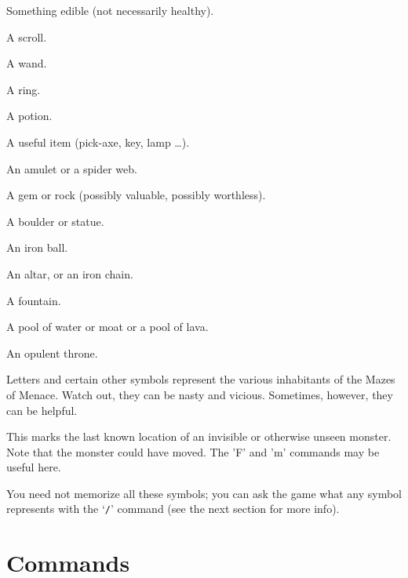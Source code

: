 \item[\tb{\%}]
Something edible (not necessarily healthy).

\item[\tb{?}]
A scroll.

\item[\tb{/}]
A wand.

\item[\tb{=}]
A ring.

\item[\tb{!}]
A potion.

\item[\tb{(}]
A useful item (pick-axe, key, lamp \ldots).

\item[\tb{"}]
An amulet or a spider web.

\item[\tb{*}]
A gem or rock (possibly valuable, possibly worthless).

\item[\tb{`}]
A boulder or statue.

\item[\tb{0}]
An iron ball.

\item[\tb{_}]
An altar, or an iron chain.

\item[\tb{\{}]
A fountain.

\item[\tb{\}}]
A pool of water or moat or a pool of lava.

\item[\tb{$\backslash$}]
An opulent throne.

\item[\tb{{\rm a}-{\rm zA}-{\rm Z} {\rm and} {\rm other} {\rm symbols}}]
Letters and certain other symbols represent the various inhabitants
of the Mazes of Menace.  Watch out, they can be nasty and vicious.
Sometimes, however, they can be helpful.

\item[\tb{{\rm I}}]
This marks the last known location of an invisible or otherwise unseen
monster.  Note that the monster could have moved.  The 'F' and 'm' commands
may be useful here.
\elist
\nd %

You need not memorize all these symbols; you can ask the game what any
symbol represents with the `{\tt /}' command (see the next section for
more info).

\section{Commands}

